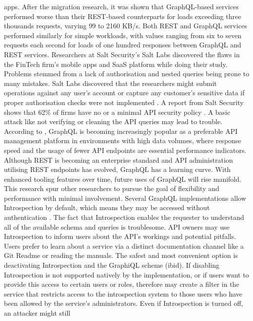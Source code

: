 apps. After the migration research, it was shown that GraphQL-based services
performed worse than their REST-based counterparts for loads exceeding three
thousands requests, varying 99 to 2160 KB/s. Both REST and GraphQL services
performed similarly for simple workloads, with values ranging from six to seven
requests each second for loads of one hundred responses between GraphQL and REST
services. Researchers at Salt Security's Salt Labs discovered the flaws in the
FinTech firm's mobile apps and SaaS platform while doing their study. Problems
stemmed from a lack of authorisation and nested queries being prone to many
mistakes. Salt Labs discovered that the researchers might submit operations
against any user's account or capture any customer's sensitive data if proper
authorisation checks were not implemented \citep{vadlamaniCanGraphQLReplace2021}.
A report from Salt Security shows that 62\% of firms have no or a minimal API
security policy \citep{vadlamaniCanGraphQLReplace2021}. A basic attack like not
verifying or cleaning the API queries may lead to trouble. According to
\citet{britoRESTVsGraphQL2020}, GraphQL is becoming increasingly popular as a
preferable API management platform in environments with high data volumes, where
response speed and the usage of fewer API endpoints are essential performance
indicators. Although REST is becoming an enterprise standard and API
administration utilising REST endpoints has evolved, GraphQL has a learning
curve. With enhanced tooling features over time, future uses of GraphQL will
rise manifold. This research spur other researchers to pursue the goal of
flexibility and performance with minimal involvement. Several GraphQL
implementations allow Introspection by default, which means they may be accessed
without authentication \citep{eizingerAPIDesignDistributed2017}. The fact that
Introspection enables the requester to understand all of the available schema
and queries is troublesome. API owners may use Introspection to inform users
about the API's workings and potential pitfalls. Users prefer to learn about a
service via a distinct documentation channel like a Git Readme or reading the
manuals. The safest and most convenient option is deactivating Introspection and
the GraphiQL scheme (ibid). If disabling Introspection is not supported natively
by the implementation, or if users want to provide this access to certain users
or roles, therefore may create a filter in the service that restricts access to
the introspection system to those users who have been allowed by the service's
administrators. Even if Introspection is turned off, an attacker might still
